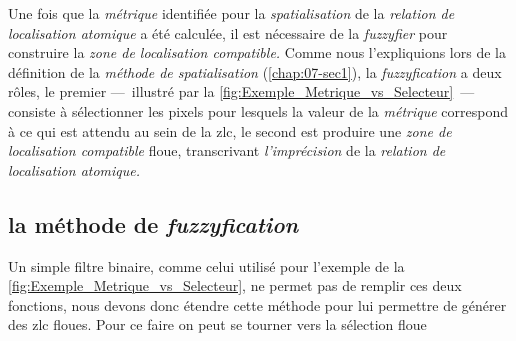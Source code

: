 Une fois que la \emph{métrique} identifiée pour la
\emph{spatialisation} de la \emph{relation de localisation atomique} a
été calculée, il est nécessaire de la \emph{fuzzyfier} pour construire
la \emph{zone de localisation compatible.} Comme nous l'expliquions
lors de la définition de la \emph{méthode de spatialisation}
(\autoref{chap:07-sec1}), la \emph{fuzzyfication} a deux rôles, le
premier ---~illustré par la
\autoref{fig:Exemple_Metrique_vs_Selecteur}~--- consiste à
sélectionner les pixels pour lesquels la valeur de la \emph{métrique}
correspond à ce qui est attendu au sein de la \ac{zlc}, le second est
produire une \emph{zone de localisation compatible} floue,
transcrivant \emph{l'imprécision} de la \emph{relation de localisation
  atomique.}

\subsection{la méthode de \emph{fuzzyfication}}

Un simple filtre binaire, comme celui utilisé pour l'exemple de la
\autoref{fig:Exemple_Metrique_vs_Selecteur}, ne permet pas de remplir
ces deux fonctions, nous devons donc étendre cette méthode pour lui
permettre de générer des \ac{zlc} floues. Pour ce faire on peut se
tourner vers la sélection floue

